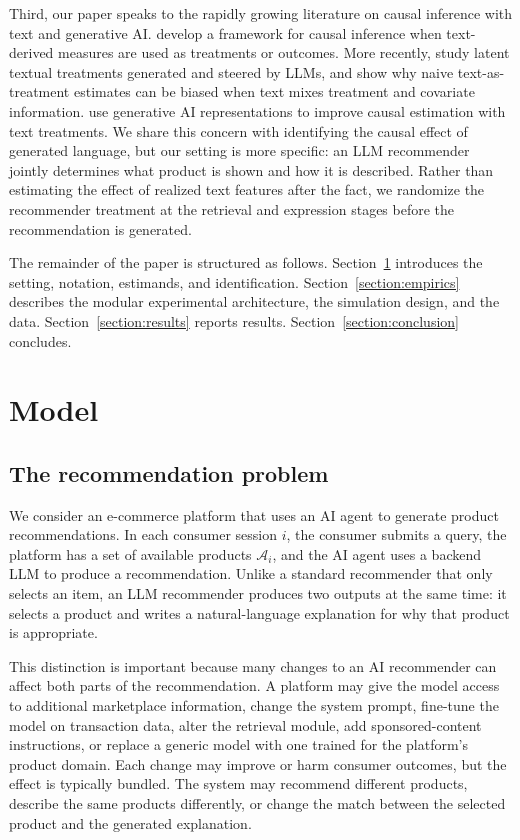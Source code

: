 \documentclass[11pt]{article}
\newcommand{\catalog}{\mathcal{A}}
\begin{document}
Third, our paper speaks to the rapidly growing literature on causal inference with text and generative AI. \citet{egami2022causal} develop a framework for causal inference when text-derived measures are used as treatments or outcomes. More recently, \citet{feldman2026latent} study latent textual treatments generated and steered by LLMs, and show why naive text-as-treatment estimates can be biased when text mixes treatment and covariate information. \citet{imai2024causal} use generative AI representations to improve causal estimation with text treatments. We share this concern with identifying the causal effect of generated language, but our setting is more specific: an LLM recommender jointly determines what product is shown and how it is described. Rather than estimating the effect of realized text features after the fact, we randomize the recommender treatment at the retrieval and expression stages before the recommendation is generated.

The remainder of the paper is structured as follows. Section~\ref{section:model} introduces the setting, notation, estimands, and identification. Section~\ref{section:empirics} describes the modular experimental architecture, the simulation design, and the data. Section~\ref{section:results} reports results. Section~\ref{section:conclusion} concludes.

\section{Model}\label{section:model}

\subsection{The recommendation problem}

We consider an e-commerce platform that uses an AI agent to generate product recommendations. In each consumer session $i$, the consumer submits a query, the platform has a set of available products $\catalog_i$, and the AI agent uses a backend LLM to produce a recommendation. Unlike a standard recommender that only selects an item, an LLM recommender produces two outputs at the same time: it selects a product and writes a natural-language explanation for why that product is appropriate.

This distinction is important because many changes to an AI recommender can affect both parts of the recommendation. A platform may give the model access to additional marketplace information, change the system prompt, fine-tune the model on transaction data, alter the retrieval module, add sponsored-content instructions, or replace a generic model with one trained for the platform's product domain. Each change may improve or harm consumer outcomes, but the effect is typically bundled. The system may recommend different products, describe the same products differently, or change the match between the selected product and the generated explanation.
\end{document}
